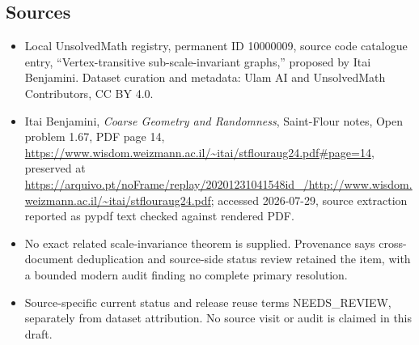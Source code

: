 \documentclass[11pt]{article}
\begin{document}
\subsection{Sources}
\begin{itemize}
\item Local UnsolvedMath registry, permanent ID 10000009, source code catalogue entry, ``Vertex-transitive sub-scale-invariant graphs,'' proposed by Itai Benjamini. Dataset curation and metadata: Ulam AI and UnsolvedMath Contributors, CC BY 4.0.
\item Itai Benjamini, \emph{Coarse Geometry and Randomness}, Saint-Flour notes, Open problem 1.67, PDF page 14, \url{https://www.wisdom.weizmann.ac.il/~itai/stflouraug24.pdf#page=14}, preserved at \url{https://arquivo.pt/noFrame/replay/20201231041548id_/http://www.wisdom.weizmann.ac.il/~itai/stflouraug24.pdf}; accessed 2026-07-29, source extraction reported as pypdf text checked against rendered PDF.
\item No exact related scale-invariance theorem is supplied. Provenance says cross-document deduplication and source-side status review retained the item, with a bounded modern audit finding no complete primary resolution.
\item Source-specific current status and release reuse terms NEEDS\_REVIEW, separately from dataset attribution. No source visit or audit is claimed in this draft.
\end{itemize}
\end{document}
